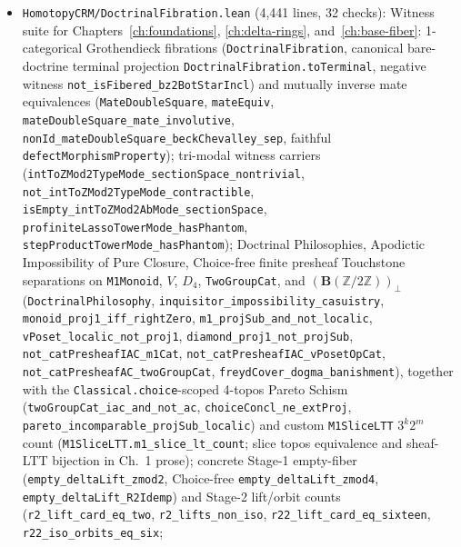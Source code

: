 \documentclass[10pt,twoside,openright]{book}
\theoremstyle{crmplain}
\theoremstyle{crmdef}
\theoremstyle{crmremark}
\begin{document}
\begin{itemize}[leftmargin=1.5em]
  \item \texttt{HomotopyCRM/\allowbreak DoctrinalFibration.lean} (4,441 lines, 32 checks): Witness suite for Chapters~\ref{ch:foundations}, \ref{ch:delta-rings}, and~\ref{ch:base-fiber}: 1-categorical Grothendieck fibrations (\texttt{DoctrinalFibration}, canonical bare-doctrine terminal projection \texttt{DoctrinalFibration.toTerminal}, negative witness \texttt{not\_\allowbreak isFibered\_\allowbreak bz2BotStarIncl}) and mutually inverse mate equivalences (\texttt{MateDoubleSquare}, \texttt{mateEquiv}, \texttt{mateDoubleSquare\_\allowbreak mate\_\allowbreak involutive}, \texttt{nonId\_\allowbreak mateDoubleSquare\_\allowbreak beckChevalley\_\allowbreak sep}, faithful \texttt{defectMorphismProperty}); tri-modal witness carriers (\texttt{intToZMod2TypeMode\_\allowbreak sectionSpace\_\allowbreak nontrivial}, \texttt{not\_\allowbreak intToZMod2TypeMode\_\allowbreak contractible}, \texttt{isEmpty\_\allowbreak intToZMod2AbMode\_\allowbreak sectionSpace}, \texttt{profiniteLassoTowerMode\_\allowbreak hasPhantom}, \texttt{stepProductTowerMode\_\allowbreak hasPhantom}); Doctrinal Philosophies, Apodictic Impossibility of Pure Closure, Choice-free finite presheaf Touchstone separations on \texttt{M1Monoid}, $V$, $D_4$, \texttt{TwoGroupCat}, and $(\mathbf{B}(\mathbb{Z}/2\mathbb{Z}))_\bot$ (\texttt{DoctrinalPhilosophy}, \texttt{inquisitor\_\allowbreak impossibility\_\allowbreak casuistry}, \texttt{monoid\_\allowbreak proj1\_\allowbreak iff\_\allowbreak rightZero}, \texttt{m1\_\allowbreak projSub\_\allowbreak and\_\allowbreak not\_\allowbreak localic}, \texttt{vPoset\_\allowbreak localic\_\allowbreak not\_\allowbreak proj1}, \texttt{diamond\_\allowbreak proj1\_\allowbreak not\_\allowbreak projSub}, \texttt{not\_\allowbreak cat\allowbreak Presheaf\allowbreak IAC\_\allowbreak m1Cat}, \texttt{not\_\allowbreak cat\allowbreak Presheaf\allowbreak IAC\_\allowbreak vPoset\allowbreak OpCat}, \texttt{not\_\allowbreak cat\allowbreak Presheaf\allowbreak AC\_\allowbreak twoGroup\allowbreak Cat}, \texttt{freyd\allowbreak Cover\_\allowbreak dogma\_\allowbreak banishment}), together with the \texttt{Classical.choice}-scoped 4-topos Pareto Schism (\texttt{twoGroup\allowbreak Cat\_\allowbreak iac\_\allowbreak and\_\allowbreak not\_\allowbreak ac}, \texttt{choiceConcl\_\allowbreak ne\_\allowbreak extProj}, \texttt{pareto\_\allowbreak incomparable\_\allowbreak projSub\_\allowbreak localic}) and custom \texttt{M1SliceLTT} $3^k 2^m$ count (\texttt{M1SliceLTT.\allowbreak m1\_\allowbreak slice\_\allowbreak lt\_\allowbreak count}; slice topos equivalence and sheaf-LTT bijection in Ch.~1 prose); concrete Stage-1 empty-fiber (\texttt{empty\_\allowbreak deltaLift\_\allowbreak zmod2}, Choice-free \texttt{empty\_\allowbreak deltaLift\_\allowbreak zmod4}, \texttt{empty\_\allowbreak deltaLift\_\allowbreak R2Idemp}) and Stage-2 lift/orbit counts (\texttt{r2\_\allowbreak lift\_\allowbreak card\_\allowbreak eq\_\allowbreak two}, \texttt{r2\_\allowbreak lifts\_\allowbreak non\_\allowbreak iso}, \texttt{r22\_\allowbreak lift\_\allowbreak card\_\allowbreak eq\_\allowbreak sixteen}, \texttt{r22\_\allowbreak iso\_\allowbreak orbits\_\allowbreak eq\_\allowbreak six}; 
\end{itemize}
\end{document}
